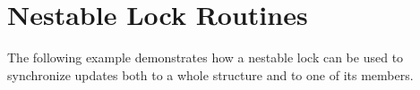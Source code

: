 \pagebreak
\chapter{Nestable Lock Routines}
\label{chap:nestable_lock}

The following example demonstrates how a nestable lock can be used to synchronize 
updates both to a whole structure and to one of its members.



